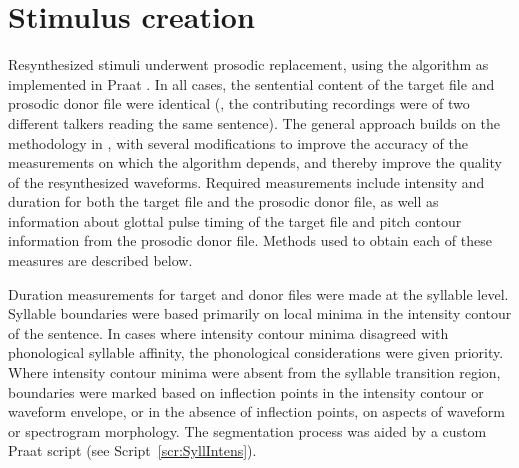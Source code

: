 \section{Stimulus creation\label{sec:StimDesign}}
Resynthesized stimuli underwent prosodic replacement, using the \psola{} algorithm as implemented in Praat \citep{praat}.  In all cases, the sentential content of the target file and prosodic donor file were identical (\ie, the contributing recordings were of two different talkers reading the same sentence).  The general approach builds on the methodology in \citet{Yoon2007}, with several modifications to improve the accuracy of the measurements on which the algorithm depends, and thereby improve the quality of the resynthesized waveforms.  Required measurements include intensity and duration for both the target file and the prosodic donor file, as well as information about glottal pulse timing of the target file and pitch contour information from the prosodic donor file.  Methods used to obtain each of these measures are described below.  


Duration measurements for target and donor files were made at the syllable level.  Syllable boundaries were based primarily on local minima in the intensity contour of the sentence.  In cases where intensity contour minima disagreed with phonological syllable affinity, the phonological considerations were given priority.\footnotemark{}  Where intensity contour minima were absent from the syllable transition region, boundaries were marked based on inflection points in the intensity contour or waveform envelope, or in the absence of inflection points, on aspects of waveform or spectrogram morphology.  The segmentation process was aided by a custom Praat script (see Script~\ref{scr:SyllIntens}).

